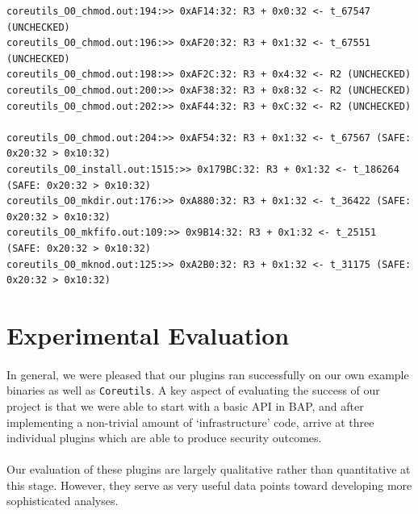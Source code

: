 \documentclass[letterpaper,11pt]{article}
\begin{document}
\small
\begin{verbatim}
coreutils_O0_chmod.out:194:>> 0xAF14:32: R3 + 0x0:32 <- t_67547 (UNCHECKED)
coreutils_O0_chmod.out:196:>> 0xAF20:32: R3 + 0x1:32 <- t_67551 (UNCHECKED)
coreutils_O0_chmod.out:198:>> 0xAF2C:32: R3 + 0x4:32 <- R2 (UNCHECKED)
coreutils_O0_chmod.out:200:>> 0xAF38:32: R3 + 0x8:32 <- R2 (UNCHECKED)
coreutils_O0_chmod.out:202:>> 0xAF44:32: R3 + 0xC:32 <- R2 (UNCHECKED)

coreutils_O0_chmod.out:204:>> 0xAF54:32: R3 + 0x1:32 <- t_67567 (SAFE: 0x20:32 > 0x10:32)
coreutils_O0_install.out:1515:>> 0x179BC:32: R3 + 0x1:32 <- t_186264 (SAFE: 0x20:32 > 0x10:32)
coreutils_O0_mkdir.out:176:>> 0xA880:32: R3 + 0x1:32 <- t_36422 (SAFE: 0x20:32 > 0x10:32)
coreutils_O0_mkfifo.out:109:>> 0x9B14:32: R3 + 0x1:32 <- t_25151 (SAFE: 0x20:32 > 0x10:32)
coreutils_O0_mknod.out:125:>> 0xA2B0:32: R3 + 0x1:32 <- t_31175 (SAFE: 0x20:32 > 0x10:32)
\end{verbatim}
\normalsize


\section{Experimental Evaluation}

\paragraph{}
In general, we were pleased that our plugins ran successfully on our own
example binaries as well as \texttt{Coreutils}. A key aspect of evaluating
the success of our project is that we were able to start with a basic API in
BAP, and after implementing a non-trivial amount of `infrastructure' code,
arrive at three individual plugins which are able to produce security outcomes.

\paragraph{}
Our evaluation of these plugins are largely qualitative rather than
quantitative at this stage. However, they serve as very useful data points
toward developing more sophisticated analyses.
\end{document}
